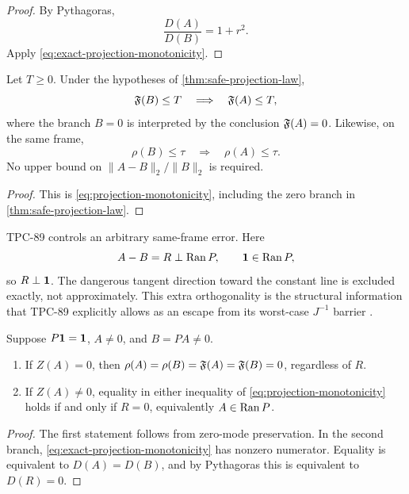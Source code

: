 \begin{proof}
By Pythagoras,
\[
 \frac{D(A)}{D(B)}=1+r^2.
\]
Apply \eqref{eq:exact-projection-monotonicity}.
\end{proof}

\begin{corollary}
\label{cor:no-accuracy-certificate}
Let \(T\ge0\).  Under the hypotheses of
\cref{thm:safe-projection-law},
\[
 \mathfrak F(B)\le T
 \quad\Longrightarrow\quad
 \mathfrak F(A)\le T,
\]
where the branch \(B=0\) is interpreted by the conclusion
\(\mathfrak F(A)=0\).  Likewise, on the same frame,
\[
 \rho(B)\le\tau
 \quad\Longrightarrow\quad
 \rho(A)\le\tau.
\]
No upper bound on \(\|A-B\|_2/\|B\|_2\) is required.
\end{corollary}

\begin{proof}
This is \eqref{eq:projection-monotonicity}, including the zero
branch in \cref{thm:safe-projection-law}.
\end{proof}

\begin{remark}
\label{rem:no-contradiction-tpc89}
TPC-89 controls an arbitrary same-frame error.  Here
\[
 A-B=R\perp\operatorname{Ran} P,\qquad
 \mathbf 1\in\operatorname{Ran} P,
\]
so \(R\perp\mathbf 1\).  The dangerous tangent direction toward the
constant line is excluded exactly, not approximately.  This extra
orthogonality is the structural information that TPC-89 explicitly
allows as an escape from its worst-case \(J^{-1}\) barrier
\citep{WangTPC89}.
\end{remark}

\begin{proposition}
\label{prop:safe-equality}
Suppose \(P\mathbf 1=\mathbf 1\), \(A\ne0\), and \(B=PA\ne0\).
\begin{enumerate}[label=(\roman*),leftmargin=2.2em]
\item If \(Z(A)=0\), then
  \(\rho(A)=\rho(B)=\mathfrak F(A)=\mathfrak F(B)=0\), regardless of \(R\).
\item If \(Z(A)\ne0\), equality in either inequality of
  \eqref{eq:projection-monotonicity} holds if and only if \(R=0\),
  equivalently \(A\in\operatorname{Ran} P\).
\end{enumerate}
\end{proposition}

\begin{proof}
The first statement follows from zero-mode preservation.  In the
second branch, \eqref{eq:exact-projection-monotonicity} has nonzero
numerator.  Equality is equivalent to \(D(A)=D(B)\), and by
Pythagoras this is equivalent to \(D(R)=0\).
\end{proof}

